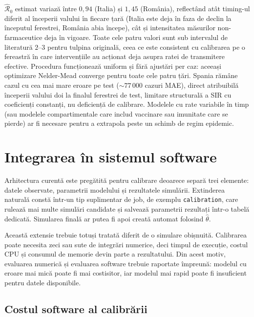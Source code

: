 


$\hat{\mathcal{R}}_0$ estimat variază între $0{,}94$ (Italia) și $1{,}45$
(România), reflectând atât timing-ul diferit al începerii valului în fiecare
țară (Italia este deja în faza de declin la începutul ferestrei, România abia
începe), cât și intensitatea măsurilor non-farmaceutice deja în vigoare.
Toate cele patru valori sunt sub intervalul de literatură $2$--$3$ pentru
tulpina originală, ceea ce este consistent cu calibrarea pe o fereastră în
care intervențiile au acționat deja asupra ratei de transmitere efective.
Procedura funcționează uniform și fără ajustări per caz: aceeași optimizare
Nelder-Mead converge pentru toate cele patru țări. Spania rămâne cazul cu cea
mai mare eroare pe test ($\sim$$77\,000$ cazuri MAE), direct atribuibilă
începerii valului doi la finalul ferestrei de test, limitare structurală a
SIR cu coeficienți constanți, nu deficiență de calibrare. Modelele cu rate
variabile în timp (sau modelele compartimentale care includ vaccinare sau
imunitate care se pierde) ar fi necesare pentru a extrapola peste un schimb
de regim epidemic.

\section{Integrarea în sistemul software}
\label{sec:integrare_calibrare_software}

Arhitectura curentă este pregătită pentru calibrare deoarece separă trei
elemente: datele observate, parametrii modelului și rezultatele simulării.
Extinderea naturală constă într-un tip suplimentar de job, de exemplu
\texttt{calibration}, care rulează mai multe simulări candidate și salvează
parametrii rezultați într-o tabelă dedicată. Simularea finală ar putea fi apoi
creată automat folosind $\hat{\theta}$.

Această extensie trebuie totuși tratată diferit de o simulare obișnuită.
Calibrarea poate necesita zeci sau sute de integrări numerice, deci timpul de
execuție, costul CPU și consumul de memorie devin parte a rezultatului. Din acest
motiv, evaluarea numerică și evaluarea software trebuie raportate împreună:
modelul cu eroare mai mică poate fi mai costisitor, iar modelul mai rapid poate
fi insuficient pentru datele disponibile.

\subsection{Costul software al calibrării}
\label{subsec:cost_calibrare}

